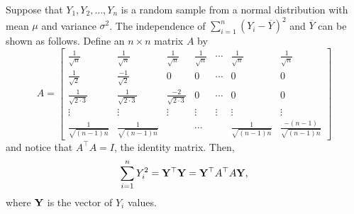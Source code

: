 \documentclass[10pt]{article}
\begin{document}
	Suppose that $Y_1, Y_2, \dots, Y_n$ is a random sample from a normal distribution with mean $\mu$ and variance $\sigma^2$. The independence of $\sum_{i=1}^n (Y_i - \overline{Y})^2$ and $\overline{Y}$ can be shown as follows. Define an $n \times n$ matrix $A$ by
	\begin{equation}
		A =
		\begin{bmatrix}
			\frac{1}{\sqrt{n}} & \frac{1}{\sqrt{n}} & \frac{1}{\sqrt{n}} & \frac{1}{\sqrt{n}} & \cdots & \frac{1}{\sqrt{n}} & \frac{1}{\sqrt{n}} \\
			\frac{1}{\sqrt{2}} & \frac{-1}{\sqrt{2}} & 0 & 0 & \cdots & 0 & 0 \\
			\frac{1}{\sqrt{2 \cdot 3}} & \frac{1}{\sqrt{2 \cdot 3}} & \frac{-2}{\sqrt{2 \cdot 3}} & 0 & \cdots & 0 &0 \\
			\vdots & \vdots & \vdots & \vdots & \vdots & \vdots & \vdots \\
			\frac{1}{\sqrt{(n-1)n}} & \frac{1}{\sqrt{(n-1)n}} && \cdots && \frac{1}{\sqrt{(n-1)n}} & \frac{-(n-1)}{\sqrt{(n-1)n}}
		\end{bmatrix}
	\end{equation}
	and notice that $A^\top A = I$, the identity matrix. Then,
	\begin{equation}
		\sum_{i = 1}^n Y_i^2 = \vb{Y}^{\top} \vb{Y} = \vb{Y}^{\top} A^{\top} A \vb{Y},
	\end{equation}
	where $\vb{Y}$ is the vector of $Y_i$ values.
\end{document}
